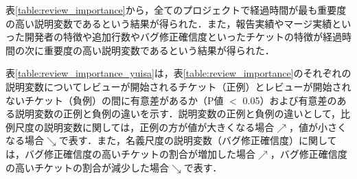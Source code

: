 \documentclass[submit]{ipsj}
\begin{document}
表\ref{table:review_importance}から，全てのプロジェクトで経過時間が最も重要度の高い説明変数であるという結果が得られた．また，報告実績やマージ実績といった開発者の特徴や追加行数やバグ修正確信度といったチケットの特徴が経過時間の次に重要度の高い説明変数であるという結果が得られた．

\begin{table}[t]
\caption{レビューが開始されるチケットの予測において重要度の高い説明変数と重要度}
\label{table:review_importance}
\centering
\vspace{0.5zh}
\end{table}

表\ref{table:review_importance_yuisa}は，表\ref{table:review_importance}のそれぞれの説明変数についてレビューが開始されるチケット（正例）とレビューが開始されないチケット（負例）の間に有意差があるか（P値 $<$ 0.05）および有意差のある説明変数の正例と負例の違いを示す．説明変数の正例と負例の違いとして，比例尺度の説明変数に関しては，正例の方が値が大きくなる場合$\nearrow$，値が小さくなる場合$\searrow$で表す．また，名義尺度の説明変数（バグ修正確信度）に関しては，バグ修正確信度の高いチケットの割合が増加した場合$\nearrow$，バグ修正確信度の高いチケットの割合が減少した場合$\searrow$で表す．
\end{document}
